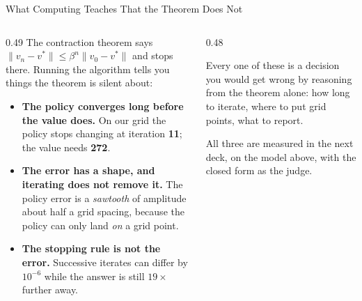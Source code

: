\begin{frame}{What Computing Teaches That the Theorem Does Not}
\begin{columns}[T]
\begin{column}{0.49\textwidth}
\small
The contraction theorem says $\lVert v_n-v^*\rVert\le\beta^n\lVert v_0-v^*\rVert$ and stops there. Running the algorithm tells you things the theorem is silent about:
\medskip
\begin{itemize}\footnotesize
  \item \textbf{The policy converges long before the value does.} On our grid the policy stops changing at iteration \textbf{11}; the value needs \textbf{272}.
  \item \textbf{The error has a shape, and iterating does not remove it.} The policy error is a \emph{sawtooth} of amplitude about half a grid spacing, because the policy can only land \emph{on} a grid point.
  \item \textbf{The stopping rule is not the error.} Successive iterates can differ by $10^{-6}$ while the answer is still $19\times$ further away.
\end{itemize}
\end{column}
\begin{column}{0.48\textwidth}
\begin{conceptbox}[title=\textbf{Why this matters}]\small
Every one of these is a decision you would get wrong by reasoning from the theorem alone: how long to iterate, where to put grid points, what to report.
\end{conceptbox}
\medskip
\begin{examplebox}\footnotesize
All three are measured in the next deck, on the model above, with the closed form as the judge.
\end{examplebox}
\end{column}
\end{columns}
\end{frame}

